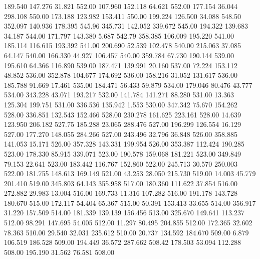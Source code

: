  189.540  147.276   31.821       552.00
 107.960  152.118   64.621       552.00
 177.154   36.044  298.108       550.00
 173.188  123.982  153.411       550.00
 199.224  126.500   34.088       548.50
 352.097  140.936  178.395       545.96
 345.731  142.052  339.672       545.00
 194.322  139.683   34.187       544.00
 171.797  143.380    5.687       542.79
 358.385  106.009  195.220       541.00
 185.114  116.615  193.392       541.00
 200.690   52.539  102.478       540.00
 215.063   37.085   64.147       540.00
 166.330   44.927  106.457       540.00
 359.784   67.730  190.144       539.00
 195.610   64.366  116.890       539.00
 187.471  139.991   20.160       537.00
  72.224  153.112   48.852       536.00
 352.878  104.677  174.692       536.00
 158.216   31.052  131.617       536.00
 185.788   91.669   17.461       535.00
 184.471   56.433   59.879       534.00
 179.046   80.476   43.777       534.00
 343.228   43.071  193.217       532.00
 141.784  141.271   88.280       531.00
  13.363  125.304  199.751       531.00
 336.536  135.942    1.553       530.00
 347.342   75.670  154.262       528.00
 336.851  132.543  152.466       528.00
 230.278  161.625  223.161       528.00
  14.639  123.950  206.182       527.75
 185.288   23.065  288.476       527.00
 196.299  126.554   16.129       527.00
 177.270  148.055  284.266       527.00
 243.496   32.796   36.848       526.00
 358.885  141.053   15.171       526.00
 357.328  143.331  199.954       526.00
 353.387  112.424  190.285       523.00
 178.330   85.915  339.071       523.00
 190.578  159.068  181.221       523.00
 349.849   79.153   22.641       523.00
 183.442  116.767  152.860       522.00
 245.713   30.570  250.003       522.00
 181.755  148.613  169.149       521.00
  43.253   28.050  215.730       519.00
  14.003   45.779  201.410       519.00
 345.803   64.143  355.958       517.00
 180.360  111.622   37.854       516.00
 272.882   29.983   13.004       516.00
 169.733   11.316  107.282       516.00
 191.178  143.728  180.670       515.00
 172.117   54.404   65.367       515.00
  50.391  153.413   33.655       514.00
 356.917   31.220  157.509       514.00
 181.339  139.139  156.456       513.00
 325.670  149.641  113.237       512.00
  98.291  147.695   54.005       512.00
  11.297   80.495  204.855       512.00
 172.365   32.602   78.363       510.00
  29.540   32.031  235.612       510.00
  20.737  134.592  184.670       509.00
   6.879  106.519  186.528       509.00
 194.449   36.572  287.662       508.42
 178.503   53.094  112.288       508.00
 195.190   31.562   76.581       508.00
